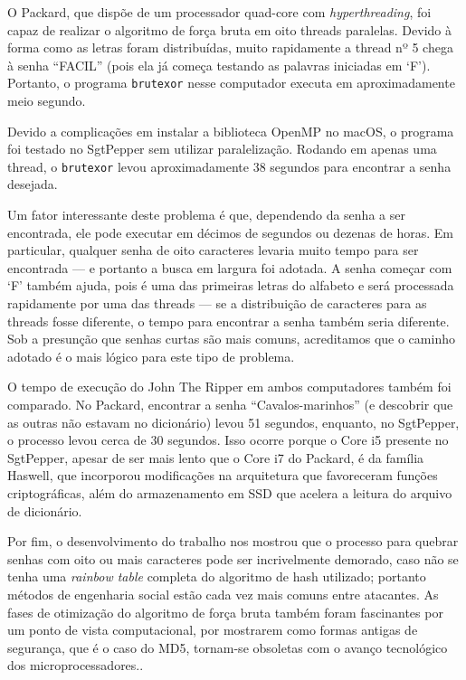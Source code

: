 \documentclass{sig-alternate-05-2015}
\begin{document}
O Packard, que dispõe de um processador quad-core com \textit{hyperthreading}, foi capaz de realizar o algoritmo de força bruta em oito threads paralelas.
Devido à forma como as letras foram distribuídas, muito rapidamente a thread nº 5 chega à senha ``FACIL'' (pois ela já começa testando as palavras iniciadas em `F').
Portanto, o programa \texttt{brutexor} nesse computador executa em aproximadamente meio segundo.

Devido a complicações em instalar a biblioteca OpenMP no macOS, o programa foi testado no SgtPepper sem utilizar paralelização.
Rodando em apenas uma thread, o \texttt{brutexor} levou aproximadamente 38 segundos para encontrar a senha desejada.

Um fator interessante deste problema é que, dependendo da senha a ser encontrada, ele pode executar em décimos de segundos ou dezenas de horas.
Em particular, qualquer senha de oito caracteres levaria muito tempo para ser encontrada — e portanto a busca em largura foi adotada.
A senha começar com `F' também ajuda, pois é uma das primeiras letras do alfabeto e será processada rapidamente por uma das threads — se a distribuição de caracteres para as threads fosse diferente, o tempo para encontrar a senha também seria diferente.
Sob a presunção que senhas curtas são mais comuns, acreditamos que o caminho adotado é o mais lógico para este tipo de problema.

O tempo de execução do John The Ripper em ambos computadores também foi comparado.
No Packard, encontrar a senha ``Cavalos-marinhos'' (e descobrir que as outras não estavam no dicionário) levou 51 segundos, enquanto, no SgtPepper, o processo levou cerca de 30 segundos.
Isso ocorre porque o Core i5 presente no SgtPepper, apesar de ser mais lento que o Core i7 do Packard, é da família Haswell, que incorporou modificações na arquitetura que favoreceram funções criptográficas, além do armazenamento em SSD que acelera a leitura do arquivo de dicionário. 

Por fim, o desenvolvimento do trabalho nos mostrou que o processo para quebrar senhas com oito ou mais caracteres pode ser incrivelmente demorado, caso não se tenha uma \textit{rainbow table} completa do algoritmo de hash utilizado; portanto métodos de engenharia social estão cada vez mais comuns entre atacantes.
As fases de otimização do algoritmo de força bruta também foram fascinantes por um ponto de vista computacional, por mostrarem como formas antigas de segurança, que é o caso do MD5, tornam-se obsoletas com o avanço tecnológico dos microprocessadores..

%

%
%
\end{document}
